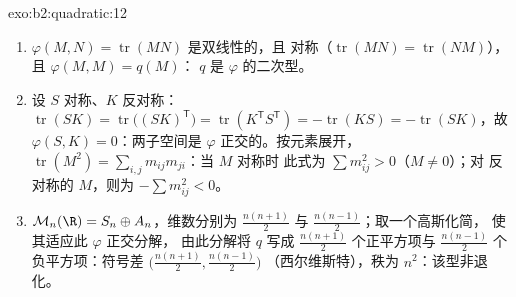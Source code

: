 \begin{solution}{exo:b2:quadratic:12}
\begin{enumerate}
  \item $\varphi(M, N) = \operatorname{tr}(MN)$ 是双线性的，且
        对称（$\operatorname{tr}(MN) =
        \operatorname{tr}(NM)$），且 $\varphi(M, M) = q(M)$：
        $q$ 是 $\varphi$ 的二次型。
  \item 设 $S$ 对称、$K$ 反对称：
        $\operatorname{tr}(SK) =
        \operatorname{tr}\bigl((SK)^{\mathsf T}\bigr) =
        \operatorname{tr}(K^{\mathsf T}S^{\mathsf T}) =
        -\operatorname{tr}(KS) = -\operatorname{tr}(SK)$，故
        $\varphi(S, K) = 0$：两子空间是
        $\varphi$ 正交的。按元素展开，$\operatorname{tr}
        (M^2) = \sum_{i,j} m_{ij}m_{ji}$：当 $M$ 对称时
        此式为 $\sum m_{ij}^2 > 0$（$M \neq 0$）；对
        反对称的 $M$，则为 $-\sum m_{ij}^2 < 0$。
  \item $\mathcal M_n(\R) = S_n \oplus A_n$，维数分别为
        $\frac{n(n+1)}2$ 与 $\frac{n(n-1)}2$；取一个高斯化简，
        使其适应此 $\varphi$ 正交分解，
        由此分解将 $q$ 写成 $\frac{n(n+1)}2$ 个正平方项与
        $\frac{n(n-1)}2$ 个负平方项：符号差
        $\bigl(\frac{n(n+1)}2, \frac{n(n-1)}2\bigr)$
        （西尔维斯特），秩为 $n^2$：该型非退化。
\end{enumerate}
\end{solution}

